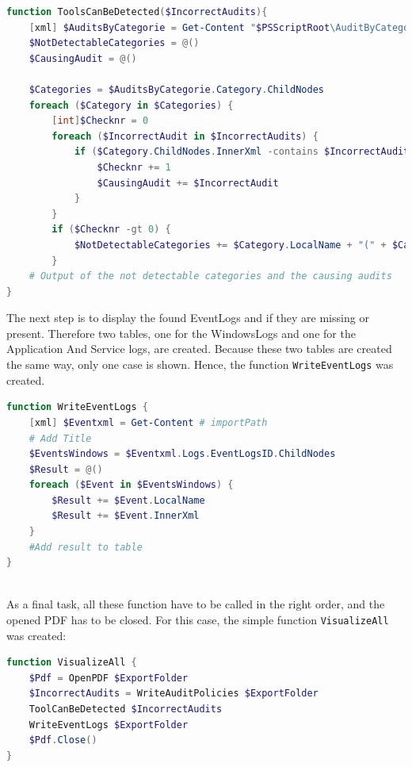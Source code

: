 \begin{lstlisting}[caption=Function ToolsCanBeDetected, language=PowerShell]
function ToolsCanBeDetected($IncorrectAudits){
    [xml] $AuditsByCategorie = Get-Content "$PSScriptRoot\AuditByCategorie.xml"
    $NotDetectableCategories = @()
    $CausingAudit = @()

    $Categories = $AuditsByCategorie.Category.ChildNodes
    foreach ($Category in $Categories) {
        [int]$Checknr = 0
        foreach ($IncorrectAudit in $IncorrectAudits) {
            if ($Category.ChildNodes.InnerXml -contains $IncorrectAudit) {
                $Checknr += 1
                $CausingAudit += $IncorrectAudit
            }
        }
        if ($Checknr -gt 0) {
            $NotDetectableCategories += $Category.LocalName + "(" + $CausingAudit + ")"
        }
    # Output of the not detectable categories and the causing audits    
}
\end{lstlisting}
The next step is to display the found EventLogs and if they are missing or present. Therefore two tables, one for the WindowsLogs and one for the Application And Service logs, are created. Because these two tables are created the same way, only one case is shown. Hence, the function \lstinline|WriteEventLogs| was created.
\begin{lstlisting}[caption=Function ToolsCanBeDetected, language=PowerShell]
function WriteEventLogs { 
    [xml] $Eventxml = Get-Content # importPath
    # Add Title
    $EventsWindows = $Eventxml.Logs.EventLogsID.ChildNodes
    $Result = @()
    foreach ($Event in $EventsWindows) {
        $Result += $Event.LocalName
        $Result += $Event.InnerXml
    }
    #Add result to table
}
\end{lstlisting}
\clearpage \ \\
As a final task, all these function have to be called in the right order, and the opened PDF has to be closed. For this case, the simple function \lstinline|VisualizeAll| was created:
\begin{lstlisting}[caption=Function VisualizeAll, language=PowerShell]
function VisualizeAll { 
    $Pdf = OpenPDF $ExportFolder
    $IncorrectAudits = WriteAuditPolicies $ExportFolder
    ToolCanBeDetected $IncorrectAudits
    WriteEventLogs $ExportFolder
    $Pdf.Close()
}
\end{lstlisting}